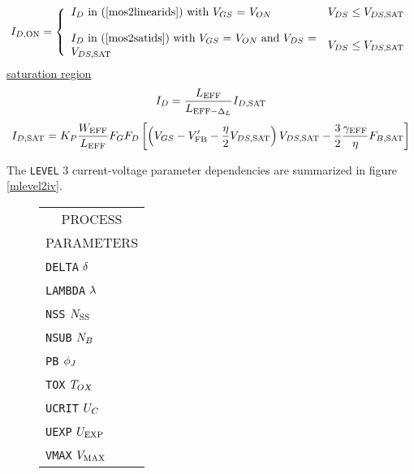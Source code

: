 {\begin{equation}
\end{equation}
\begin{equation}
I_{D,\ms{ON}} =  \left\{ \begin{array}{ll}
                  \parbox{3in}{$I_{D}$ in (\ref{mos2linearids})
                               with $V_{GS}$ = $V_{ON}$}
                  & V_{DS} \le V_{DS,\ms{SAT}} \\ \\
                  \parbox{3in}{$I_{D}$ in (\ref{mos2satids})
                               with $V_{GS}$ = $V_{ON}$ and
                               $V_{DS}$ = $V_{DS,\ms{SAT}}$}
                  & V_{DS} \le V_{DS,\ms{SAT}}
                  \end{array} \right. %
\end{equation}
%
%
\underline{saturation region}
\begin{equation}
I_{D} =   {{L_{\mbox{\scriptsize EFF}}}\over{\textstyle L_{\mbox{\scriptsize EFF}-\Delta_L}}}
           I_{D,\mbox{\scriptsize SAT}}
      \label{mos2satids}
\end{equation}
\begin{equation}
I_{D,\mbox{\scriptsize SAT}}  =   K_P {{W_{\mbox{\scriptsize EFF}}}\over{ L_{\mbox{\scriptsize EFF}}}} F_G F_D
           \left[ \left( V_{GS} - V'_{\mbox{\scriptsize FB}}
            -{{\eta}\over 2} V_{DS,\mbox{\scriptsize SAT}}\right)
	   V_{DS,\mbox{\scriptsize SAT}}
           -{{\textstyle 3}\over{\textstyle 2}}
           {{\textstyle \gamma_{\mbox{\scriptsize EFF}}}\over{\textstyle \eta }}
           F_{B,\mbox{\scriptsize SAT}}
           \right]
\end{equation}
{
The {\tt LEVEL} 3 current-voltage parameter dependencies are summarized in
figure \ref{mlevel2iv}.\\[0.2in]
\begin{figure}
\begin{tabular}[t]{|p{1in}|}
\hline
\multicolumn{1}{|c|}{PROCESS} \\
\multicolumn{1}{|c|}{PARAMETERS} \\
\hline
\hline
{\tt DELTA} \hfill $\delta$\\
{\tt LAMBDA} \hfill $\lambda$\\
{\tt NSS} \hfill $N_{\mbox{\scriptsize SS}}$\\
{\tt NSUB} \hfill $N_B$\\
{\tt PB} \hfill $\phi_J$\\
{\tt TOX} \hfill $T_{OX}$\\
{\tt UCRIT} \hfill $U_C$\\
{\tt UEXP} \hfill $U_{\mbox{\scriptsize EXP}}$\\
{\tt VMAX} \hfill $V_{\mbox{\scriptsize MAX}}$\\

\end{tabular}
\end{figure}}}
